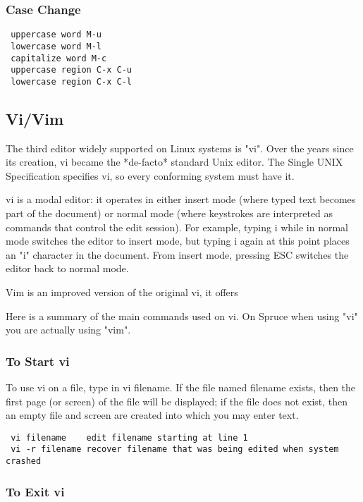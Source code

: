\subsubsection{Case Change}

\begin{lstlisting}
 uppercase word M-u
 lowercase word M-l
 capitalize word M-c
 uppercase region C-x C-u
 lowercase region C-x C-l
\end{lstlisting}

\subsection{Vi/Vim}

The third editor widely supported on Linux systems is "vi".
Over the years since its creation, vi became the *de-facto* standard Unix editor. 
The Single UNIX Specification specifies vi, so every conforming system must have it.

vi is a modal editor: it operates in either insert mode (where typed text becomes part of the document) or normal mode (where keystrokes are interpreted as commands that control the edit session). 
For example, typing i while in normal mode switches the editor to insert mode, but typing i again at this point places an "i" character in the document. 
From insert mode, pressing ESC switches the editor back to normal mode.

Vim is an improved version of the original vi, it offers 

Here is a summary of the main commands used on vi. On Spruce when using "vi" you are actually using "vim".


\subsubsection{To Start vi}

To use vi on a file, type in vi filename. If the file named filename exists, then the first page (or screen) of the file will be displayed; if the file does not exist, then an empty file and screen are created into which you may enter text.

\begin{lstlisting}
 vi filename	edit filename starting at line 1
 vi -r filename	recover filename that was being edited when system crashed
\end{lstlisting}

\subsubsection{To Exit vi}

